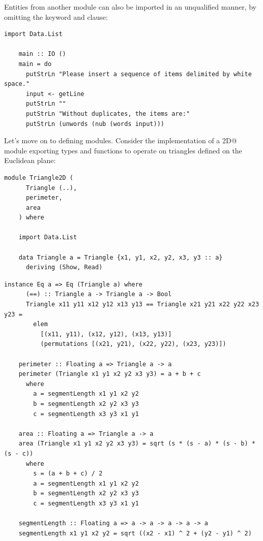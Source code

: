 \documentclass[UdineBachThesis,american,11pt]{PhdThesis}
\begin{document}
  Entities from another module can also be imported in an unqualified manner,
  by omitting the \lstinline@qualified@ keyword and \lstinline@as@ clause:

  \begin{lstlisting}[gobble=4,basicstyle=\ttfamily\small]
    import Data.List

    main :: IO ()
    main = do
      putStrLn "Please insert a sequence of items delimited by white space."
      input <- getLine
      putStrLn ""
      putStrLn "Without duplicates, the items are:"
      putStrLn (unwords (nub (words input)))
  \end{lstlisting}

  Let's move on to defining modules. Consider the implementation of a
  \lstinline@Triangle2D@ module exporting types and functions to operate on
  triangles defined on the Euclidean plane:

  \begin{lstlisting}[gobble=4,basicstyle=\ttfamily\small]
    module Triangle2D (
      Triangle (..),
      perimeter,
      area
    ) where

    import Data.List

    data Triangle a = Triangle {x1, y1, x2, y2, x3, y3 :: a}
      deriving (Show, Read)
  \end{lstlisting}

  \newpage

  \begin{lstlisting}[gobble=4,basicstyle=\ttfamily\small]
    instance Eq a => Eq (Triangle a) where
      (==) :: Triangle a -> Triangle a -> Bool
      Triangle x11 y11 x12 y12 x13 y13 == Triangle x21 y21 x22 y22 x23 y23 =
        elem
          [(x11, y11), (x12, y12), (x13, y13)]
          (permutations [(x21, y21), (x22, y22), (x23, y23)])

    perimeter :: Floating a => Triangle a -> a
    perimeter (Triangle x1 y1 x2 y2 x3 y3) = a + b + c
      where
        a = segmentLength x1 y1 x2 y2
        b = segmentLength x2 y2 x3 y3
        c = segmentLength x3 y3 x1 y1

    area :: Floating a => Triangle a -> a
    area (Triangle x1 y1 x2 y2 x3 y3) = sqrt (s * (s - a) * (s - b) * (s - c))
      where
        s = (a + b + c) / 2
        a = segmentLength x1 y1 x2 y2
        b = segmentLength x2 y2 x3 y3
        c = segmentLength x3 y3 x1 y1

    segmentLength :: Floating a => a -> a -> a -> a -> a
    segmentLength x1 y1 x2 y2 = sqrt ((x2 - x1) ^ 2 + (y2 - y1) ^ 2)
  \end{lstlisting}
\end{document}
